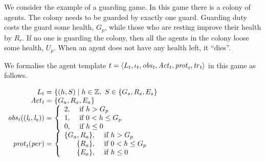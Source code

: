 


\begin{example}
  \label{ex:agent-template}
  We consider the example of a guarding game. In this game there is a colony of agents. The colony needs to be guarded by exactly one guard. Guarding duty costs the guard some health, $G_p$, while those who are resting improve their health by $R_r$. If no one is guarding the colony, then all the agents in the colony loose some health, $U_p$. When an agent does not have any health left, it ``dies''.

  We formalise the agent template
  ${t} = \left \langle L_{t}, \iota_{t}, \it{obs}_{t}, \it{Act}_{t}, \it{prot}_{t},
    \it{tr}_{t}  \right \rangle$ in this game as follows.

  $
  \begin{array}{r@{~}l}
    \lstates{t} = & \{(h,S) \mid h \in \mathbb{Z}, \ S \in \{G_s, R_s, E_s\} \\
    \acts{t} = & \{G_a, R_a, E_a\}\\

    \obs{t}((\lstate{t},\lstate{e})) = & \left\{
                      \begin{array}{rl}
                        2, & \text{ if } h > G_p\\ 
                        1, & \text{ if } 0 < h \leq G_p\\ 
                        0, & \text{ if } h \leq 0\\
                      \end{array} \right.\\

    
    \prot{t}(per) = & \left\{
                      \begin{array}{rl}
                        \{G_a, R_a\}, & \text{ if } h > G_p\\ 
                        \{R_a\}, & \text{ if } 0 < h \leq G_p\\ 
                        \{E_a\}, & \text{ if } h \leq 0\\
                      \end{array} \right.\\
  \end{array}
  $


\end{example}
